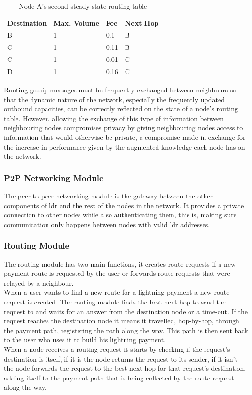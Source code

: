 \begin{table}[H]
\centering
\begin{tabular}{|l|l|l|l|}
\hline
\rowcolor[HTML]{C0C0C0} 
Destination & Max. Volume   & Fee   & Next Hop \\ \hline
B           & 1             & 0.1   & B       \\ \hline
C           & 1             & 0.11  & B       \\ \hline
C           & 1             & 0.01  & C       \\ \hline
D           & 1             & 0.16  & C       \\ \hline
\end{tabular}
\caption{Node A's second steady-state routing table}
\label{table:routing_table_steady_a_2}
\end{table}

Routing gossip messages must be frequently exchanged between neighbours so that the dynamic nature of the network, especially the frequently updated outbound capacities, can be correctly reflected on the state of a node's routing table. However, allowing the exchange of this type of information between neighbouring nodes compromises privacy by giving neighbouring nodes access to information that would otherwise be private, a compromise made in exchange for the increase in performance given by the augmented knowledge each node has on the network.

\subsubsection{P2P Networking Module}

The peer-to-peer networking module is the gateway between the other components of \acrshort{ldr} and the rest of the nodes in the network. It provides a private connection to other nodes while also authenticating them, this is, making sure communication only happens between nodes with valid \acrshort{ldr} addresses.

\subsubsection{Routing Module}

The routing module has two main functions, it creates route requests if a new payment route is requested by the user or forwards route requests that were relayed by a neighbour. \\
When a user wants to find a new route for a lightning payment a new route request is created. The routing module finds the best next hop to send the request to and waits for an answer from the destination node or a time-out. If the request reaches the destination node it means it travelled, hop-by-hop, through the payment path, registering the path along the way. This path is then sent back to the user who uses it to build his lightning payment. \\
When a node receives a routing request it starts by checking if the request's destination is itself, if it is the node returns the request to its sender, if it isn't the node forwards the request to the best next hop for that request's destination, adding itself to the payment path that is being collected by the route request along the way.